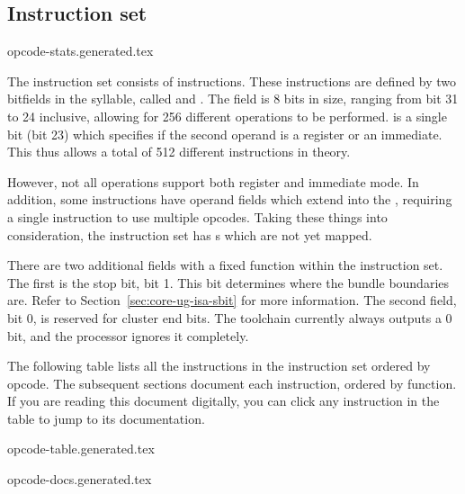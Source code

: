\subsection{Instruction set}
\label{sec:core-ug-isa-insn-set}

{opcode-stats.generated.tex}

The \rvex{} instruction set consists of \instructioncount{} instructions. These
instructions are defined by two bitfields in the syllable, called 
and . The  field is 8 bits in size, ranging from bit
31 to 24 inclusive, allowing for 256 different operations to be performed.
 is a single bit (bit 23) which specifies if the second operand is a
register or an immediate. This thus allows a total of 512 different
instructions in theory.

However, not all operations support both register and immediate mode. In
addition, some instructions have operand fields which extend into the
, requiring a single instruction to use multiple opcodes. Taking
these things into consideration, the \rvex{} instruction set has
\freeopcodecount{} s which are not yet mapped.

There are two additional fields with a fixed function within the instruction
set. The first is the stop bit, bit 1. This bit determines where the bundle
boundaries are. Refer to Section~\ref{sec:core-ug-isa-sbit} for more
information. The second field, bit 0, is reserved for cluster end bits. The
toolchain currently always outputs a 0 bit, and the processor ignores it
completely.

The following table lists all the instructions in the \rvex{} instruction set
ordered by opcode. The subsequent sections document each instruction, ordered by
function. If you are reading this document digitally, you can click any
instruction in the table to jump to its documentation.

{opcode-table.generated.tex}

\newcommand{\insndocsection}[1]{\subsubsection{#1}}
{opcode-docs.generated.tex}

